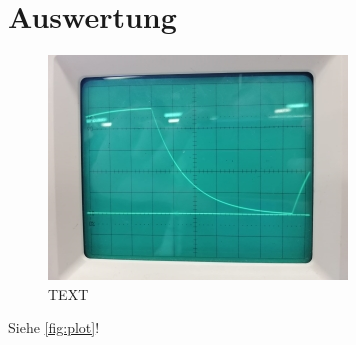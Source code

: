 \section{Auswertung}
\label{sec:Auswertung}

\begin{figure}
  \centering
  \includegraphics{content/ErsterTeil.jpg}
  \caption{TEXT}
  \label{fig:ErsterTeil}
\end{figure}


Siehe \autoref{fig:plot}!

